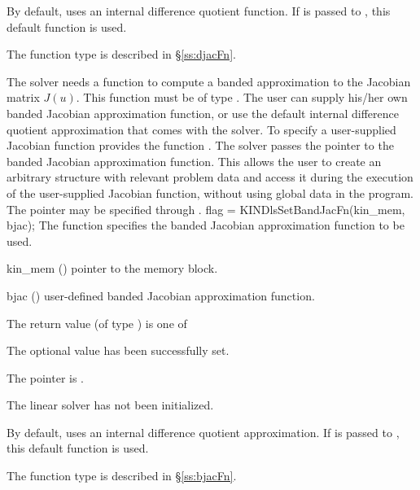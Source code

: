 {
  By default, {\kindense} uses an internal difference quotient function.
  If  is passed to , this default function is used.

  The function type  is described in \S\ref{ss:djacFn}.
}
The 
{\kindense} solver needs a function to compute a banded approximation to
the Jacobian matrix $J(u)$.  This function must be of type . 
The user can supply his/her own banded Jacobian approximation function, 
or use the default internal difference quotient approximation
that comes with the {\kinband} solver.
To specify a user-supplied Jacobian function  {\kinband} provides 
the function .
The {\kinband} solver passes the pointer 
to the banded Jacobian approximation function. This allows the user to
create an arbitrary structure with relevant problem data and access it
during the execution of the user-supplied Jacobian function, without
using global data in the program.  The pointer  may be
specified through .
{
  flag = KINDlsSetBandJacFn(kin\_mem, bjac);
}
{
  The function  specifies the banded Jacobian
  approximation function to be used.
}
{
  \begin{args}
  \item[kin\_mem] ()
    pointer to the {\kinsol} memory block.
  \item[bjac] ()
    user-defined banded Jacobian approximation function.
  \end{args}
}
{
  The return value  (of type ) is one of
  \begin{args}
  \item[\Id{KINDLS\_SUCCESS}] 
    The optional value has been successfully set.
  \item[\Id{KINDLS\_MEM\_NULL}]
    The  pointer is .
  \item[\Id{KINDLS\_LMEM\_NULL}]
    The {\kinband} linear solver has not been initialized.
  \end{args}
}
{
  By default, {\kinband} uses an internal difference quotient approximation.
  If  is passed to , this default function is used.

  The function type  is described in \S\ref{ss:bjacFn}.
}

